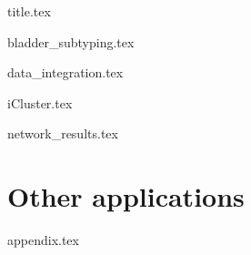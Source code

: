 \documentclass[a4paper, 12pt]{article}
\begin{document}
{title.tex}



\setcounter{tocdepth}{1} %
\setcounter{tocdepth}{2} %
\setcounter{tocdepth}{3} %
\setcounter{tocdepth}{4} %

\tableofcontents

\newpage

\listoffigures

\listoftables


\newpage

\printglossary[type=acronym] 


\newpage

{bladder_subtyping.tex}

\break

{data_integration.tex}

\newpage

{iCluster.tex}

\newpage


{network_results.tex}

\newpage

\section{Other applications}

\newpage



 

{appendix.tex}
    
\end{document}
